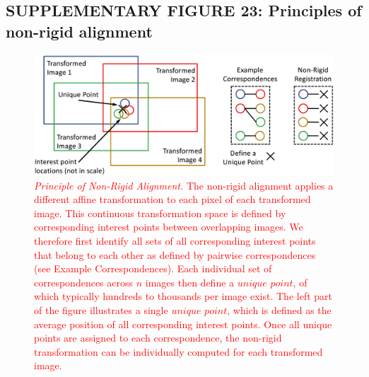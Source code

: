 \documentclass[]{spie}  %
\def\red{\textcolor{red}}
\begin{document}
\subsection*{SUPPLEMENTARY FIGURE 23: Principles of non-rigid alignment}
\vspace{1mm}
\begin{figure}[h!]
\includegraphics[width=\textwidth]{non-rigid.png}
\vspace{-2.0mm}
\caption{\hspace{-0.5mm} \red{\emph{Principle of Non-Rigid Alignment.} The non-rigid alignment applies a different affine transformation to each pixel of each transformed image. This continuous transformation space is defined by corresponding interest points between overlapping images. We therefore first identify all sets of all corresponding interest points that belong to each other as defined by pairwise correspondences (see Example Correspondences). Each individual set of correspondences across $n$ images then define a $unique$ $point$, of which typically hundreds to thousands per image exist. The left part of the figure illustrates a single $unique$ $point$, which is defined as the average position of all corresponding interest points. Once all unique points are assigned to each correspondence, the non-rigid transformation can be individually computed for each transformed image.
}}
\label{fig:non-rigid}
\end{figure}
\end{document}
